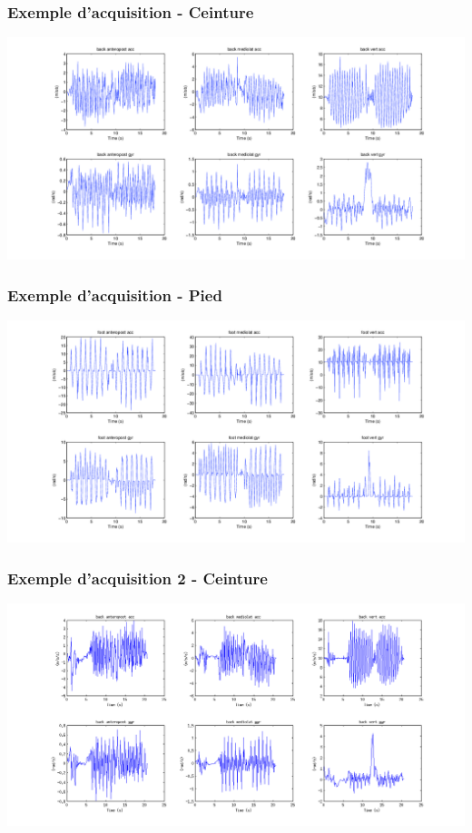 \documentclass{beamer}
\begin{document}
\begin{frame}
	\frametitle{Exemple d'acquisition - Ceinture}

			\hspace*{-2.75cm}\includegraphics[scale=0.40]{examplevisuback}

\end{frame}

\begin{frame}
	\frametitle{Exemple d'acquisition - Pied}

			\hspace*{-2.75cm}\includegraphics[scale=0.4]{examplevisufoot}

\end{frame}

\begin{frame}
	\frametitle{Exemple d'acquisition 2 - Ceinture}

	\hspace*{-2.75cm}\includegraphics[scale=0.40]{errorexamplevisuback}

\end{frame}
\end{document}
